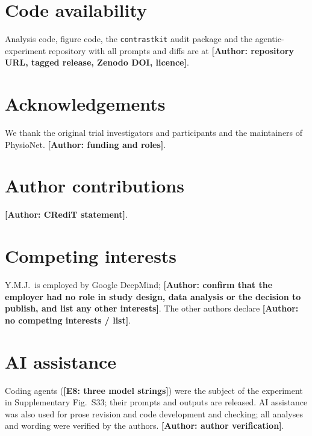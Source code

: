 \documentclass[11pt,a4paper]{article}
\newcommand{\tbd}[1]{{\color{red}\textbf{[#1]}}}
\newcommand{\authorpending}[1]{{\color{red}\textbf{[Author: #1]}}}
\begin{document}
\section*{Code availability}
Analysis code, figure code, the \texttt{contrastkit} audit package and the agentic-experiment repository with all prompts and diffs are at \authorpending{repository URL, tagged release, Zenodo DOI, licence}.

\section*{Acknowledgements}
We thank the original trial investigators and participants and the maintainers of PhysioNet. \authorpending{funding and roles}.

\section*{Author contributions}
\authorpending{CRediT statement}.

\section*{Competing interests}
Y.M.J.\ is employed by Google DeepMind; \authorpending{confirm that the employer had no role in study design, data analysis or the decision to publish, and list any other interests}. The other authors declare \authorpending{no competing interests / list}.

\section*{AI assistance}
Coding agents (\tbd{E8: three model strings}) were the subject of the experiment in Supplementary Fig.~S33; their prompts and outputs are released. AI assistance was also used for prose revision and code development and checking; all analyses and wording were verified by the authors. \authorpending{author verification}.
\end{document}

